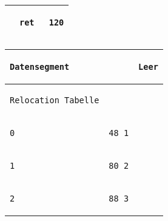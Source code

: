 \documentclass{ti2}
\begin{document}
\begin{tabular}{ | l | l | l|}
\begin{lstlisting}
\end{lstlisting} &
\begin{lstlisting}
ret 
\end{lstlisting} &
\begin{lstlisting}
120
\end{lstlisting} \\ \hline \hline
\end{tabular}

\begin{tabular}{ | l | l | l|} \hline \hline
\begin{lstlisting}
Datensegment
\end{lstlisting} &
\begin{lstlisting}
\end{lstlisting} &
\begin{lstlisting}
Leer
\end{lstlisting} \\ \hline \hline

\begin{lstlisting}
Relocation Tabelle
\end{lstlisting} &
\begin{lstlisting}
\end{lstlisting} &
\begin{lstlisting}

\end{lstlisting} \\ \hline 

\begin{lstlisting}
0
\end{lstlisting} &
\begin{lstlisting}
48 1
\end{lstlisting} &
\begin{lstlisting}
\end{lstlisting} \\ \hline 

\begin{lstlisting}
1
\end{lstlisting} &
\begin{lstlisting}
80 2
\end{lstlisting} &
\begin{lstlisting}
\end{lstlisting} \\ \hline 

\begin{lstlisting}
2
\end{lstlisting} &
\begin{lstlisting}
88 3
\end{lstlisting} &
\begin{lstlisting}
\end{lstlisting} \\ \hline 


\end{tabular}
\end{document}
